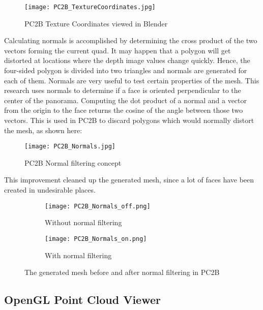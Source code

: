 \begin{figure}[h]
	\centering
	\texttt{[image: PC2B\_TextureCoordinates.jpg]}
	\caption{PC2B Texture Coordinates viewed in Blender}
	\label{fig:pc2b_texture_coordinates}
\end{figure}


Calculating normals is accomplished by determining the cross product of the two vectors forming the current quad. It may happen that a polygon will get distorted at locations where the depth image values change quickly. Hence, the four-sided polygon is divided into two triangles and normals are generated for each of them. Normals are very useful to test certain properties of the mesh. This research uses normals to determine if a face is oriented perpendicular to the center of the panorama. Computing the dot product of a normal and a vector from the origin to the face returns the cosine of the angle between those two vectors. This is used in PC2B to discard polygons which would normally distort the mesh, as shown here:

\begin{figure}[h]
	\centering
	\texttt{[image: PC2B\_Normals.jpg]}
	\caption{PC2B Normal filtering concept}
	\label{fig:pc2b_normals}
\end{figure}

This improvement cleaned up the generated mesh, since a lot of faces have been created in undesirable places.


\begin{figure}[h]
	\centering
	\begin{subfigure}[b]{0.45\textwidth}
		\centering
		\texttt{[image: PC2B\_Normals\_off.png]}
		\caption{Without normal filtering}
		\label{fig:PC2B_normals_off}
	\end{subfigure}
	\hfill
	\begin{subfigure}[b]{0.45\textwidth}
		\centering
		\texttt{[image: PC2B\_Normals\_on.png]}
		\caption{With normal filtering}
		\label{fig:PC2B_normals_on}
	\end{subfigure}
	\caption{The generated mesh before and after normal filtering in PC2B}
	\label{fig:PC2B_normal_filtering}
\end{figure}


\subsection{OpenGL Point Cloud Viewer}

